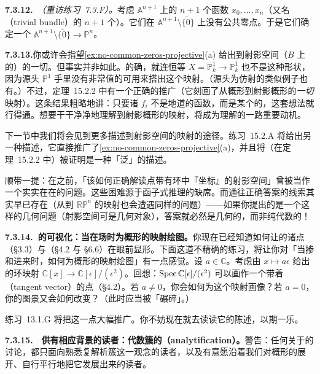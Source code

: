 \textbf{7.3.12.}\ \emph{\trhExample{}（重访练习~7.3.F）。}\quad 考虑 $\mathbb{A}^{n+1}$ 上的 $n+1$ 个函数 $x_0,\dots,x_n$（又名\trTrivialBundle{}（trivial bundle）的 $n+1$ 个\trSection）。它们在 $\mathbb{A}^{n+1}\setminus\{\tilde{0}\}$ 上没有公共零点。于是它们确定一个\trMorphism{} $\mathbb{A}^{n+1}\setminus\{\tilde{0}\}\to\mathbb{P}^n$。%

\textbf{7.3.13.}\quad 你或许会指望\cref{ex:no-common-zeros-projective}(a) 给出到射影空间（$B$ 上的）的一切\trMorphism。但事实并非如此。的确，就连恒等\trMorphism{} $X=\mathbb{P}^1_k\to\mathbb{P}^1_k$ 也不是这种形状，因为源头 $\mathbb{P}^1$ 手里没有非常值的\trGlobalSections{}可用来搭出这个映射。（源头为仿射的类似例子也有。）不过，\mbox{定理~15.2.2} 中有一个正确的推广（它刻画了从概形到射影概形的\emph{一切}映射）。这条结果粗略地讲：只要诸 $f_i$ 不是地道的函数，而是某个\trLineBundle{}的\trSection，这套想法就行得通。想要干干净净地理解到射影概形的映射，将成为理解\trLineBundle{}的一路重要动机。

下一节中我们将会见到更多描述到射影空间的映射的途径。\mbox{练习~15.2.A} 将给出另一种描述，它直接推广了\cref{ex:no-common-zeros-projective}(a)，并且将（在\mbox{定理~15.2.2} 中）被证明是一种「泛」的描述。

顺带一提：在\trGrothendieck{}之前，「该如何正确解读点带有环中『坐标』的射影空间」曾被当作一个实实在在的问题。这些困难源于函子式推理的缺席。而通往正确答案的线索其实早已存在（从\trManifold{}到 $\mathbb{RP}^n$ 的映射也会遭遇同样的问题）——如果你提出的是一个这样的几何问题（射影空间可是几何对象），答案就必然是几何的，而非纯代数的！

\textbf{7.3.14.\ \trMorphism{}的可视化：当\trNilpotent{}在场时为概形的映射绘图。}\quad 你现在已经知道如何让\trScheme{}的诸点（\S3.3）与\trNilpotent（\S4.2 与 \S6.6）在眼前显形。下面这道不精确的练习，将让你对「当\trNilpotent{}掺和进来时，如何为概形的映射绘图」有一点感觉。设 $a\in\mathbb{C}$。考虑由 $x\mapsto a\epsilon$ 给出的环映射 $\mathbb{C}[x]\to\mathbb{C}[\epsilon]/(\epsilon^2)$。回想：$\operatorname{Spec}\mathbb{C}[\epsilon]/(\epsilon^2)$ 可以画作一个带着\trTangentVector{}（tangent vector）的点（\S4.2）。若 $a\neq0$，你会如何为这个映射画像？若 $a=0$，你的图景又会如何改变？（此时\trTangentVector{}应当被「碾碎」。）

\mbox{练习~13.1.G} 将把这一点大幅推广。你不妨现在就去读读它的陈述，以期一乐。

\textbf{7.3.15.}\ \extrahard\ \textbf{供有相应背景的读者：\trComplex{}代数簇的\trAnalytification{}（analytification）。}\quad 警告：任何关于\trAnalytification{}的讨论，都只面向熟悉复解析簇这一观念的读者，以及有意愿沿着我们对概形的展开、自行平行地把它发展出来的读者。%

